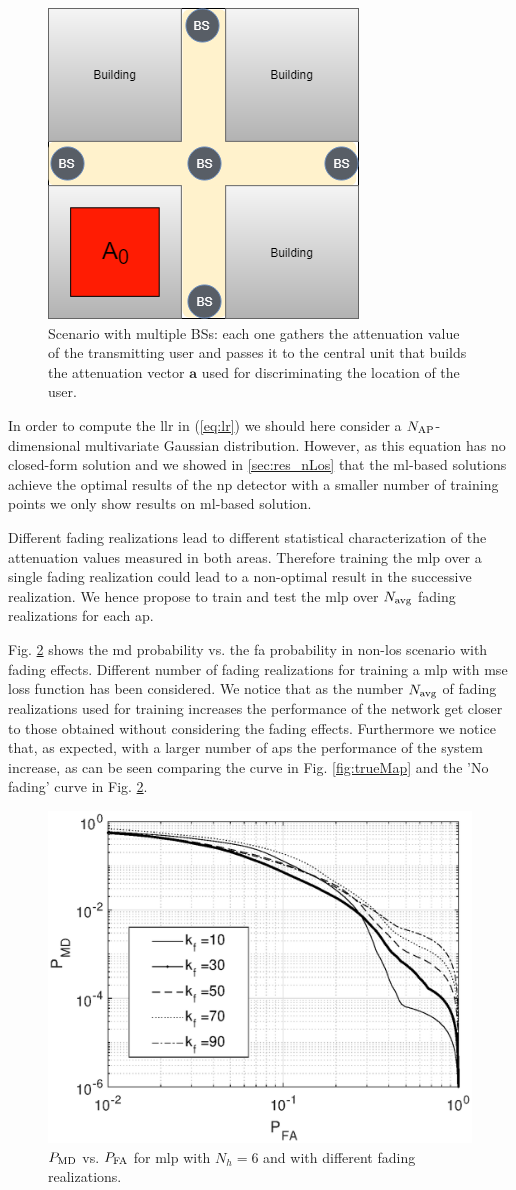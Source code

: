 \documentclass[draftcls,onecolumn,12pt]{IEEEtran}
\begin{document}
\begin{figure}[t]
    \centering
    \includegraphics[width=0.3\columnwidth]{scenario2.png}
    \caption{Scenario with multiple BSs: each one gathers the attenuation value of the transmitting user and passes it to the central unit that builds the attenuation vector $\bm{a}$ used for discriminating the location of the user.}
    \label{fig:mBS}
\end{figure}

In order to compute the \ac{llr} in (\ref{eq:lr}) we should here consider a $N_{\rm AP}$-dimensional multivariate Gaussian distribution. However, as this equation has no closed-form solution and we showed in \ref{sec:res_nLos} that the \ac{ml}-based solutions achieve the optimal results of the \ac{np} detector with a smaller number of training points we only show results on \ac{ml}-based solution.

Different fading realizations lead to different statistical characterization of the attenuation values measured in both areas. Therefore training the \ac{mlp} over a single fading realization could lead to a non-optimal result in the successive realization. We hence propose to train and test the \ac{mlp} over $N_{\rm avg}$ fading realizations for each \ac{ap}.

Fig. \ref{fig:faded} shows the \ac{md} probability vs. the \ac{fa} probability in non-\ac{los} scenario with fading effects. Different number of fading realizations for training a \ac{mlp} with \ac{mse} loss function has been considered. We notice that as the number $N_{\rm avg}$ of fading realizations used for training increases the performance of the network get closer to those obtained without considering the fading effects. Furthermore we notice that, as expected, with a larger number of \acp{ap} the performance of the system increase, as can be seen comparing the curve in Fig. \ref{fig:trueMap} and the 'No fading' curve in Fig. \ref{fig:faded}.

\begin{figure}[t]
    \centering
    \includegraphics[width=0.5\columnwidth]{res_avg_nFading.eps}
    \caption{$P_{\rm MD}$ vs. $P_{\rm FA}$ for \ac{mlp} with $N_h = 6$ and with different fading realizations.}
    \label{fig:faded}
\end{figure}
\end{document}
